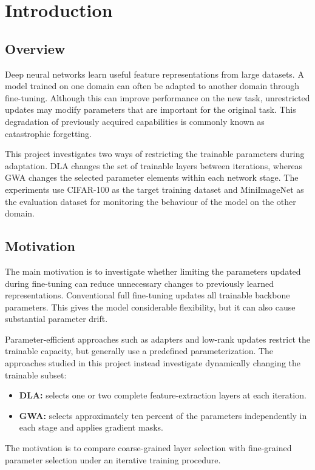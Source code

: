 \documentclass[12pt,a4paper]{report}
\begin{document}
\chapter{Introduction}

\section{Overview}
Deep neural networks learn useful feature representations from large
datasets. A model trained on one domain can often be adapted to another
domain through fine-tuning. Although this can improve performance on the
new task, unrestricted updates may modify parameters that are important
for the original task. This degradation of previously acquired
capabilities is commonly known as catastrophic forgetting.

This project investigates two ways of restricting the trainable
parameters during adaptation. DLA changes the set of trainable layers
between iterations, whereas GWA changes the selected parameter elements
within each network stage. The experiments use CIFAR-100 as the target
training dataset and MiniImageNet as the evaluation dataset for
monitoring the behaviour of the model on the other domain.

\section{Motivation}
The main motivation is to investigate whether limiting the parameters
updated during fine-tuning can reduce unnecessary changes to previously
learned representations. Conventional full fine-tuning updates all
trainable backbone parameters. This gives the model considerable
flexibility, but it can also cause substantial parameter drift.

Parameter-efficient approaches such as adapters and low-rank updates
restrict the trainable capacity, but generally use a predefined
parameterization. The approaches studied in this project instead
investigate dynamically changing the trainable subset:
\begin{itemize}
    \item \textbf{DLA:} selects one or two complete feature-extraction
    layers at each iteration.
    \item \textbf{GWA:} selects approximately ten percent of the
    parameters independently in each stage and applies gradient masks.
\end{itemize}

The motivation is to compare coarse-grained layer selection with
fine-grained parameter selection under an iterative training procedure.
\end{document}
